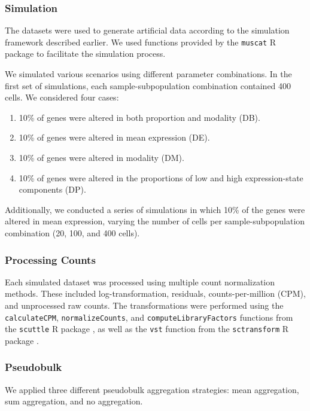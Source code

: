 \documentclass[a4paper, 11pt, twocolumn]{article}
\begin{document}
\begin{multicols}{2}
\subsubsection{Simulation}

The datasets were used to generate artificial data according to the simulation framework described earlier. We used functions provided by the \texttt{muscat} R package \citep{muscat} to facilitate the simulation process.

We simulated various scenarios using different parameter combinations. In the first set of simulations, each sample-subpopulation combination contained 400 cells. We considered four cases:
\begin{enumerate}[itemsep=0pt, topsep=0pt]
	\item 10\% of genes were altered in both proportion and modality (DB).
	\item 10\% of genes were altered in mean expression (DE).
	\item 10\% of genes were altered in modality (DM).
	\item 10\% of genes were altered in the proportions of low and high expression-state components (DP).
\end{enumerate}

Additionally, we conducted a series of simulations in which 10\% of the genes were altered in mean expression, varying the number of cells per sample-subpopulation combination (20, 100, and 400 cells).

\subsubsection{Processing Counts}

Each simulated dataset was processed using multiple count normalization methods. These included log-transformation, residuals, counts-per-million (CPM), and unprocessed raw counts. The transformations were performed using the \texttt{calculateCPM}, \texttt{normalizeCounts}, and \texttt{computeLibraryFactors} functions from the \texttt{scuttle} R package \citep{scatter}, as well as the \texttt{vst} function from the \texttt{sctransform} R package \citep{sctrans}.

\subsubsection{Pseudobulk}

We applied three different pseudobulk aggregation strategies: mean aggregation, sum aggregation, and no aggregation.


\end{multicols}
\end{document}
